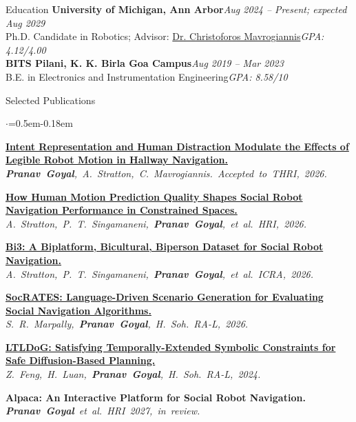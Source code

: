 \documentclass{resume}
\newcommand{\me}{{\normalfont\bfseries Pranav Goyal}}
\newcommand{\pubmeta}[1]{{\em\mbox{#1}}}
\begin{document}
\begin{rSection}{Education}
{\bf University of Michigan, Ann Arbor}\hfill {\em Aug 2024 -- Present; expected Aug 2029}
\\ Ph.D. Candidate in Robotics; Advisor: \href{https://chrismavrogiannis.com/}{Dr. Christoforos Mavrogiannis}\hfill {\em GPA: 4.12/4.00}
\\[0.3em] {\bf BITS Pilani, K. K. Birla Goa Campus}\hfill {\em Aug 2019 -- Mar 2023}
\\ B.E. in Electronics and Instrumentation Engineering\hfill {\em GPA: 8.58/10}
\end{rSection}

\begin{rSection}{Selected Publications}
\begin{list}{$\cdot$}{\leftmargin=0pt\itemindent=0pt\listparindent=0pt=0.5em\itemsep -0.18em}
\item \href{https://arxiv.org/abs/2609.40158}{\bf Intent Representation and Human Distraction Modulate the Effects of Legible Robot Motion in Hallway Navigation.} \pubmeta{\me, A. Stratton, C. Mavrogiannis. Accepted to THRI, 2026.}
\item \href{https://arxiv.org/abs/2601.09856}{\bf How Human Motion Prediction Quality Shapes Social Robot Navigation Performance in Constrained Spaces.} \pubmeta{A. Stratton, P. T. Singamaneni, \me, et al. HRI, 2026.}
\item \href{https://arxiv.org/abs/2605.06863}{\bf Bi3: A Biplatform, Bicultural, Biperson Dataset for Social Robot Navigation.}\\ \pubmeta{A. Stratton, P. T. Singamaneni, \me, et al. ICRA, 2026.}
\item \href{https://ieeexplore.ieee.org/document/11704112}{\bf SocRATES: Language-Driven Scenario Generation for Evaluating Social Navigation Algorithms.} \pubmeta{S. R. Marpally, \me, H. Soh. RA-L, 2026.}
\item \href{https://arxiv.org/abs/2405.04235}{\bf LTLDoG: Satisfying Temporally-Extended Symbolic Constraints for Safe Diffusion-Based Planning.} \pubmeta{Z. Feng, H. Luan, \me, H. Soh. RA-L, 2024.}
\item {\bf Alpaca: An Interactive Platform for Social Robot Navigation.} \pubmeta{\me\ et al. HRI 2027, in review.}
\end{list}
\end{rSection}
\end{document}
